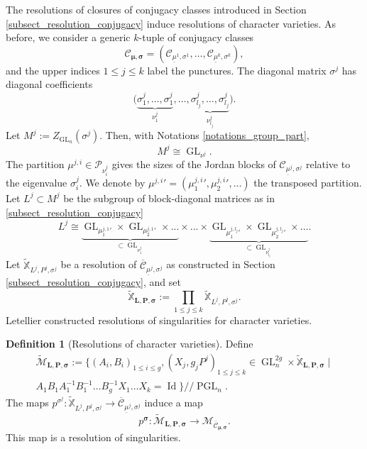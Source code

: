 \documentclass[11pt]{article}
\newcommand{\gitquot}{/\!\!/}
\theoremstyle{definition}
\newtheorem{definition}{Definition}[section]
\theoremstyle{plain}
\DeclareMathOperator{\Id}{Id}
\DeclareMathOperator{\GL}{GL}
\DeclareMathOperator{\PGL}{PGL}
\newcommand{\Part}{\mathcal{P}}
\newcommand{\inv}{^{-1}}
\newcommand{\mlps}{\widetilde{\mathcal{M}}_{\boldsymbol{L},\boldsymbol{P},\boldsymbol{\sigma}}}
\begin{document}
The resolutions of closures of conjugacy classes introduced in Section \ref{subsect_resolution_conjugacy} induce resolutions of character varieties. As before, we consider a generic $k$-tuple of conjugacy classes
\[
\mathcal{C}_{\boldsymbol{\mu},\boldsymbol{\sigma}} =(\mathcal{C}_{\underline{\mu}^1,\sigma^1}, \dots, \mathcal{C}_{\underline{\mu}^k,\sigma^k}),
\]
and the upper indices $1\le j \le k$ label the punctures. The diagonal matrix $\sigma^j$ has diagonal coefficients
\[
\bigl(\underbrace{\sigma^j_1,\dots,\sigma^j_{1}}_{\nu^j_1},\dots, \underbrace{\sigma^j_{l_j},\dots,\sigma^j_{l_j}}_{\nu^j_{l_j}}\bigl).
\]
Let $M^j:= Z_{\GL_n} (\sigma^j)$. Then, with Notations \ref{notations_group_part},
\[
M^j\cong \GL_{\nu^j}.
\]
The partition $\mu^{j,i}\in \Part_{\nu^{j}_i}$ gives the sizes of the Jordan blocks of $\mathcal{C}_{\underline{\mu}^j,\sigma^j}$ relative to the eigenvalue $\sigma^j_i$. We denote by ${\mu^{j,i}}'=({\mu^{j,i}_1}',{\mu^{j,i}_2}',\dots)$ the transposed partition. Let $L^j\subset M^j$ be the subgroup of block-diagonal matrices as in \ref{subsect_resolution_conjugacy}
\[
L^j \cong \underbrace{\GL_{{\mu^{j,1}_1}'}\times \GL_{{\mu^{j,1}_2}'} \times \dots }_{\subset \GL_{\nu^j_1}}\times \dots \times \underbrace{\GL_{{\mu^{j,l_j}_1}'}\times \GL_{{\mu^{j,l_j}_2}'} \times \dots}_{\subset \GL_{\nu^j_{l_j}}}.
\]
Let $\mathbb{\widetilde{X}}_{L^j,P^j,\sigma^j}$ be a resolution of $\overline{\mathcal{C}}_{\underline{\mu}^j,\sigma^j}$ as constructed in Section \ref{subsect_resolution_conjugacy}, and set
\[
\mathbb{\widetilde{X}}_{\boldsymbol{L},\boldsymbol{P},\boldsymbol{\sigma}} := \prod_{1\le j\le k} \mathbb{\widetilde{X}}_{L^j,P^j,\sigma^j}.
\]
Letellier \cite{Letellier13} constructed resolutions of singularities for character varieties.
\begin{definition}[Resolutions of character varieties]\label{def_resol_char}
Define
\begin{multline}
\mlps := \bigl\lbrace(A_i, B_i)_{1\le i \le g}, (X_j, g_j P^j)_{1\le j \le k} \in \GL_n^{2 g}\times \mathbb{\widetilde{X}}_{\boldsymbol{L},\boldsymbol{P},\boldsymbol{\sigma}}\mid\\
A_1 B_1 A\inv_1 B\inv_1 \dots B\inv_g X_1\dots X_k = \Id\bigr\rbrace\gitquot\PGL_n.
\end{multline}
The maps $p^{\sigma^j} : \mathbb{\widetilde{X}}_{L^j,P^j,\sigma^j} \to \overline{\mathcal{C}}_{\underline{\mu}^j,\sigma^j}$ induce a map
\[
p^{\boldsymbol{\sigma}} : \mlps \to \mathcal{M}_{\overline{\mathcal{C}}_{\boldsymbol{\mu},\boldsymbol{\sigma}}}.
\]
This map is a resolution of singularities.
\end{definition}
\end{document}

